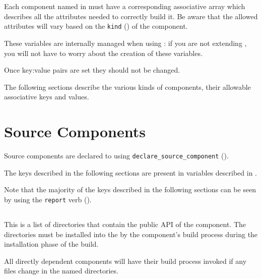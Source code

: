\section{}\label{variables:lmsbw-component-component}

Each component named in \lmsbwcomponents must have a corresponding
associative array which describes all the attributes needed to
correctly build it.  Be aware that the allowed attributes will vary
based on the \texttt{kind} () of the component.

These variables are internally managed when using \lmsbw: if you are
not extending \lmsbw, you will not have to worry about the creation of
these variables.

Once key:value pairs are set they should not be changed.

The following sections describe the various kinds of components, their
allowable associative keys and values.

\section{Source Components}

Source components are declared to \lmsbw using
\texttt{declare\_source\_component}
().

The keys described in the following sections are present in variables
described in .

Note that the majority of the keys described in the following sections
can be seen by using the \texttt{report} verb
().


\subsection{}\label{variables:api}

This is a list of directories that contain the public API of the
component.  The directories must be installed into the \destdir by the
component's build process during the installation phase of the build.

All directly dependent components will have their build process
invoked if any files change in the named directories.

